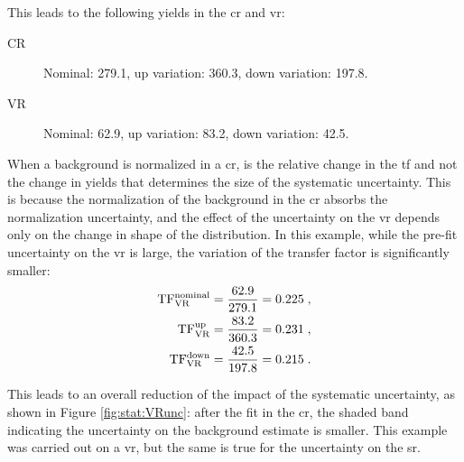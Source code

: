 \begin{itemize}
This leads to the following yields in the \gls{cr} and \gls{vr}:

\begin{description}
\item[CR] Nominal: 279.1, up variation: 360.3, down variation: 197.8.
\item[VR] Nominal: 62.9, up variation: 83.2, down variation: 42.5.
\end{description}

\noindent When a background is normalized in a \gls{cr}, is the relative change in the \gls{tf} and not the change in yields that determines the size of the systematic uncertainty.
This is because the normalization of the background in the \gls{cr} absorbs the normalization uncertainty, and the effect of the uncertainty on the \gls{vr} depends only on the change in shape of the distribution. 
In this example, while the pre-fit uncertainty on the \gls{vr} is large, the variation of the transfer factor is significantly smaller:
\begin{equation}
\begin{split}
\rm TF^{nominal}_{VR} &= \frac{62.9}{279.1} = 0.225 \; ,\\
\rm TF^{up}_{VR} &= \frac{83.2}{360.3} = 0.231 \; , \\
\rm TF^{down}_{VR} &= \frac{42.5}{197.8} = 0.215 \; . \\
\end{split}
\end{equation}

\noindent This leads to an overall reduction of the impact of the systematic uncertainty, as shown in Figure \ref{fig:stat:VRunc}:  
after the fit in the \gls{cr}, the shaded band indicating the uncertainty on the background estimate is smaller. 
This example was carried out on a \gls{vr}, but the same is true for the uncertainty on the \gls{sr}.


\end{itemize}
